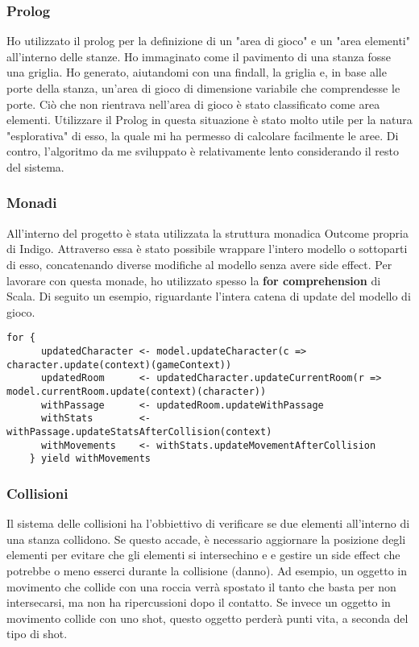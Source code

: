 \subsubsection{Prolog}
Ho utilizzato il prolog per la definizione di un "area di gioco" e un "area elementi" all'interno delle stanze. Ho immaginato come il pavimento di una stanza fosse una griglia. 
Ho generato, aiutandomi con una findall, la griglia e, in base alle porte della stanza, un'area di gioco di dimensione variabile che comprendesse le porte. 
Ciò che non rientrava nell'area di gioco è stato classificato come area elementi.
Utilizzare il Prolog in questa situazione è stato molto utile per la natura "esplorativa" di esso, la quale mi ha permesso di calcolare facilmente le aree. Di contro, l'algoritmo da me sviluppato è relativamente lento considerando il resto del sistema. 

\subsubsection{Monadi}
All'interno del progetto è stata utilizzata la struttura monadica Outcome propria di Indigo. 
Attraverso essa è stato possibile wrappare l'intero modello o sottoparti di esso, concatenando diverse modifiche al modello senza avere side effect. Per lavorare con questa monade, ho utilizzato spesso la \textbf{for comprehension} di Scala. 
Di seguito un esempio, riguardante l'intera catena di update del modello di gioco. 
\begin{lstlisting}[basicstyle=\tiny]
for {
      updatedCharacter <- model.updateCharacter(c => character.update(context)(gameContext))
      updatedRoom      <- updatedCharacter.updateCurrentRoom(r => model.currentRoom.update(context)(character))
      withPassage      <- updatedRoom.updateWithPassage
      withStats        <- withPassage.updateStatsAfterCollision(context)
      withMovements    <- withStats.updateMovementAfterCollision
    } yield withMovements
\end{lstlisting}

\subsubsection{Collisioni}
Il sistema delle collisioni ha l'obbiettivo di verificare se due elementi all'interno di una stanza collidono. 
Se questo accade, è necessario aggiornare la posizione degli elementi per evitare che gli elementi si intersechino e 
e gestire un side effect che potrebbe o meno esserci durante la collisione (danno). 
Ad esempio, un oggetto in movimento che collide con una roccia verrà spostato il tanto che basta per non intersecarsi, ma non ha ripercussioni dopo il contatto. 
Se invece un oggetto in movimento collide con uno shot, questo oggetto perderà punti vita, a seconda del tipo di shot. 

